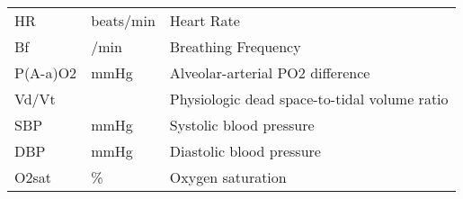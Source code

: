 \begin{table}[p]
\begin{tabular}{| m{2cm}  m{2cm}  m{7cm} |}
	HR        & beats/min   & Heart Rate                                   \\
	Bf        & /min        & Breathing Frequency                          \\
	P(A-a)O2  & mmHg        & Alveolar-arterial PO2 difference             \\
	Vd/Vt     &             & Physiologic dead space-to-tidal volume ratio \\
	SBP       & mmHg        & Systolic blood pressure                      \\
	DBP       & mmHg        & Diastolic blood pressure                     \\
	O2sat     & \%          & Oxygen saturation                            \\ \hline
\end{tabular}

\end{table}
